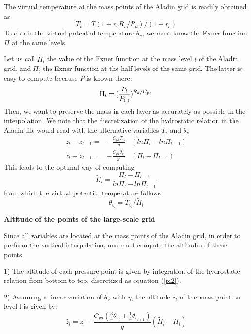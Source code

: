 The virtual temperature at the mass points of the Aladin grid is readily obtained
as
\begin{equation}
T_v= T  (1+r_v R_v/R_d)/(1+r_v)
\end{equation}
To obtain the virtual potential temperature $\theta_v$, we must know the
Exner function $\Pi$ at the same levels.

Let us call $\tilde{\Pi}_l$ the
value of the Exner function at the mass level $l$ of the Aladin grid, and
$\Pi_l$ the Exner function at the half levels of the same grid. The
latter is easy to compute because $P$ is known there:
\begin{equation}
\Pi_l= ({ P_l \over P_{00} })^{ R_d / C_{pd}}
\end{equation}
Then, we want to preserve the mass in each layer as accurately as possible
in the interpolation. We note that the discretization of the
hydrostatic relation in the Aladin file would read with the alternative
variables $T_v$ and $\theta_v$
\begin{eqnarray}
\label{pi1}
z_l-z_{l-1}=&-\frac{C_{pd}T_{v_l}}{g}&(ln\Pi_l-ln\Pi_{l-1})\\
\label{pi2}
z_l-z_{l-1}=&-\frac{C_{pd}\theta_{v_l}}{g}&(\Pi_l-\Pi_{l-1})
\end{eqnarray}
This leads to the optimal way of computing
\begin{equation}
\tilde\Pi_l=\frac{\Pi_l-\Pi_{l-1}}{ln\Pi_l-ln\Pi_{l-1}}
\end{equation}
from which the virtual potential temperature follows
\begin{equation}
\theta_{v_l} = T_{v_l} / \tilde{\Pi}_l
\end{equation}

{\bf Altitude of the points of the large-scale grid}

Since all variables are located at the mass points of the Aladin grid,
in order to perform the vertical interpolation, one must compute the
altitudes of these points.

1) The altitude of each pressure point is given by integration
of the hydrostatic relation from bottom to top, discretized as equation
(\ref{pi2}).

2) Assuming a linear variation of $\theta_v$ with $\eta$,
the altitude $\tilde{z_l}$
of the mass point on level l is given by:
\begin{equation}
\tilde{z_l}=z_l-\frac{C_{pd}\left( \frac{3}{4}\theta_{v_l}
+\frac{1}{4}\theta_{v_{l+1}}\right)}{g}(\tilde\Pi_l-\Pi_l)
\end{equation}

